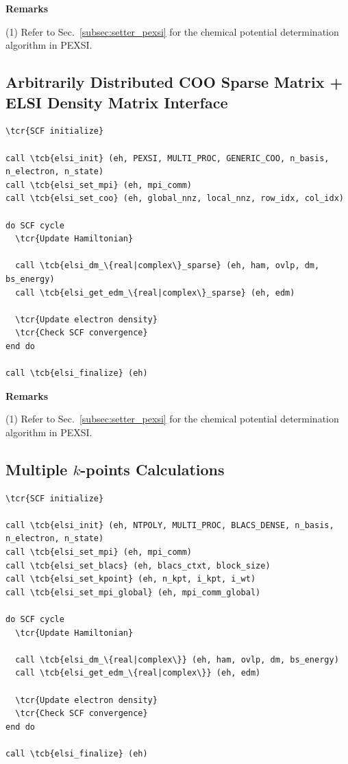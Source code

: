 \documentclass{report}
\newcommand{\tcb}[1]{\textcolor{blue}{#1}}
\newcommand{\tcr}[1]{\textcolor{red}{#1}}
\begin{document}
\textbf{Remarks}

(1) Refer to Sec.~\ref{subsec:setter_pexsi} for the chemical potential determination algorithm in PEXSI.

\subsection*{Arbitrarily Distributed COO Sparse Matrix + ELSI Density Matrix Interface}
\begin{tcolorbox}
\begin{Verbatim}[commandchars=\\\{\}]
\tcr{SCF initialize}

call \tcb{elsi_init} (eh, PEXSI, MULTI_PROC, GENERIC_COO, n_basis, n_electron, n_state)
call \tcb{elsi_set_mpi} (eh, mpi_comm)
call \tcb{elsi_set_coo} (eh, global_nnz, local_nnz, row_idx, col_idx)

do SCF cycle
  \tcr{Update Hamiltonian}

  call \tcb{elsi_dm_\{real|complex\}_sparse} (eh, ham, ovlp, dm, bs_energy)
  call \tcb{elsi_get_edm_\{real|complex\}_sparse} (eh, edm)

  \tcr{Update electron density}
  \tcr{Check SCF convergence}
end do

call \tcb{elsi_finalize} (eh)
\end{Verbatim}
\end{tcolorbox}

\textbf{Remarks}

(1) Refer to Sec.~\ref{subsec:setter_pexsi} for the chemical potential determination algorithm in PEXSI.

\subsection*{Multiple $k$-points Calculations}
\begin{tcolorbox}
\begin{Verbatim}[commandchars=\\\{\}]
\tcr{SCF initialize}

call \tcb{elsi_init} (eh, NTPOLY, MULTI_PROC, BLACS_DENSE, n_basis, n_electron, n_state)
call \tcb{elsi_set_mpi} (eh, mpi_comm)
call \tcb{elsi_set_blacs} (eh, blacs_ctxt, block_size)
call \tcb{elsi_set_kpoint} (eh, n_kpt, i_kpt, i_wt)
call \tcb{elsi_set_mpi_global} (eh, mpi_comm_global)

do SCF cycle
  \tcr{Update Hamiltonian}

  call \tcb{elsi_dm_\{real|complex\}} (eh, ham, ovlp, dm, bs_energy)
  call \tcb{elsi_get_edm_\{real|complex\}} (eh, edm)

  \tcr{Update electron density}
  \tcr{Check SCF convergence}
end do

call \tcb{elsi_finalize} (eh)
\end{Verbatim}
\end{tcolorbox}
\end{document}
